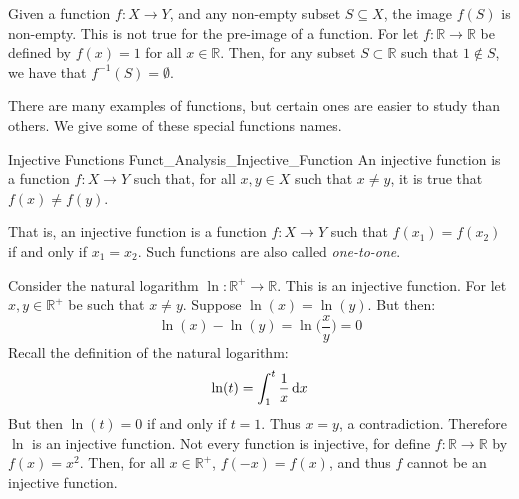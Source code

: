             \begin{lexample}
                Given a function $f:X\rightarrow{Y}$, and any
                non-empty subset $S\subseteq{X}$, the image
                $f(S)$ is non-empty. This is not true for the
                pre-image of a function. For let
                $f:\mathbb{R}\rightarrow\mathbb{R}$ be defined by
                $f(x)=1$ for all $x\in\mathbb{R}$. Then, for any
                subset $S\subset\mathbb{R}$ such that
                $1\notin{S}$, we have that
                $f^{\minus{1}}(S)=\emptyset$.
            \end{lexample}
            There are many examples of functions, but certain
            ones are easier to study than others. We give some
            of these special functions names.
            \begin{ldefinition}{Injective Functions}
                  {Funct_Analysis_Injective_Function}
                An \gls{injective function} is a function
                $f:X\rightarrow{Y}$ such that, for all
                $x,y\in{X}$ such that $x\ne{y}$, it is true that
                $f(x)\ne{f}(y)$.
            \end{ldefinition}
            That is, an injective function is a function
            $f:X\rightarrow{Y}$ such that $f(x_{1})=f(x_{2})$
            if and only if $x_{1}=x_{2}$. Such functions are also
            called \textit{one-to-one}.
            \begin{lexample}
                Consider the natural logarithm
                $\ln:\mathbb{R}^{+}\rightarrow\mathbb{R}$. This
                is an injective function. For let
                $x,y\in\mathbb{R}^{+}$ be such that $x\ne{y}$.
                Suppose $\ln(x)=\ln(y)$. But then:
                \begin{equation}
                    \ln(x)-\ln(y)=\ln\Big(\frac{x}{y}\Big)=0
                \end{equation}
                Recall the definition of the natural logarithm:
                \begin{equation}
                    \ln(t)=\int_{1}^{t}\frac{1}{x}\mathop{}\!\mathrm{d}{x}
                \end{equation}
                But then $\ln(t)=0$ if and only if $t=1$. Thus
                $x=y$, a contradiction. Therefore $\ln$ is an
                injective function. Not every function is
                injective, for define
                $f:\mathbb{R}\rightarrow\mathbb{R}$ by
                $f(x)=x^{2}$. Then, for all $x\in\mathbb{R}^{+}$,
                $f(\minus{x})=f(x)$, and thus $f$ cannot be an
                injective function.
            \end{lexample}
